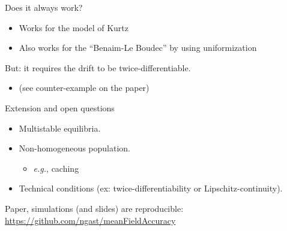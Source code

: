 \documentclass{beamer}
\newcommand\red[1]{{\color{red}#1}}
\begin{document}
\begin{frame}{Does it always work?}
  \begin{itemize}
  \item Works for the model of Kurtz
  \item Also works for the ``Benaim-Le Boudec'' by using uniformization
  \end{itemize}

  \bigskip
  But: it requires the drift to be \red{twice-differentiable}. 
  \begin{itemize}
  \item (see counter-example on the paper)
  \end{itemize}
\end{frame}


\begin{frame}{Extension and open questions}
  \begin{itemize}
  \item Multistable equilibria. 
  \item Non-homogeneous population. 
    \begin{itemize}
    \item \emph{e.g.}, caching 
    \end{itemize}
  \item Technical conditions (ex: twice-differentiability or
    Lipschitz-continuity).
  \end{itemize}
  
  \bigskip\bigskip
  
  Paper, simulations (and slides) are \red{reproducible}:
  \url{https://github.com/ngast/meanFieldAccuracy}
\end{frame}

\appendix
\end{document}
